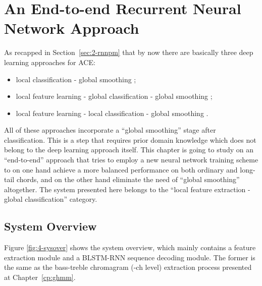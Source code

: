 
\chapter{An End-to-end Recurrent Neural Network Approach}\label{cp:endtoend} %


\ifpdf
    \graphicspath{{X/figures/PNG/}{X/figures/PDF/}{X/figures/}}
\else
    \graphicspath{{X/figures/EPS/}{X/figures/}}
\fi

As recapped in Section~\ref{sec:2-rnnpm} that by now there are basically three deep learning approaches for ACE:
\begin{itemize}
\item local classification - global smoothing \cite{humphrey2012rethinking};
\item local feature learning - global classification - global smoothing \cite{boulanger2013audio,sigtia2015audio};
\item local feature learning - local classification - global smoothing \cite{zhou2015chord}.
\end{itemize}
All of these approaches incorporate a ``global smoothing'' stage after classification. This is a step that requires prior domain knowledge which does not belong to the deep learning approach itself. This chapter is going to study on an ``end-to-end'' approach that tries to employ a new neural network training scheme to on one hand achieve a more balanced performance on both ordinary and long-tail chords, and on the other hand eliminate the need of ``global smoothing'' altogether. The system presented here belongs to the ``local feature extraction - global classification'' category.


\section{System Overview}\label{sec:4-sysover}
Figure \ref{fig:4-sysover} shows the system overview, which mainly contains a feature extraction module and a BLSTM-RNN sequence decoding module. The former is the same as the bass-treble chromagram (-ch level) extraction process presented at Chapter~\ref{cp:ghmm}.

